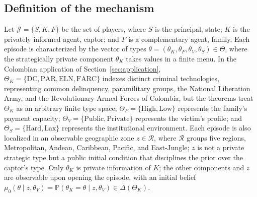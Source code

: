 \documentclass[pdflatex,sn-mathphys-ay]{sn-jnl}
\theoremstyle{plain}
\theoremstyle{definition}
\newcommand{\Prob}{\mathbb{P}}
\newcommand{\ThetaK}{\Theta_K}
\newcommand{\1}{\mathbf{1}}
\begin{document}
\subsection{Definition of the mechanism}\label{subsec:def-mecanismo}


Let $\mathcal{J}=\{S,K,F\}$ be the set of players, where $S$ is the principal, state; $K$ is the privately informed agent, captor; and $F$ is a complementary agent, family. Each episode is characterized by the vector of types $\theta=(\theta_K,\theta_F,\theta_V,\theta_S)\in\Theta$, where the strategically private component $\theta_K$ takes values in a finite menu. In the Colombian application of Section~\ref{sec:application}, $\ThetaK=\{\text{DC},\text{PAR},\text{ELN},\text{FARC}\}$ indexes distinct criminal technologies, representing common delinquency, paramilitary groups, the National Liberation Army, and the Revolutionary Armed Forces of Colombia, but the theorems treat $\ThetaK$ as an arbitrary finite type space; $\Theta_F=\{\text{High},\text{Low}\}$ represents the family's payment capacity; $\Theta_V=\{\text{Public},\text{Private}\}$ represents the victim's profile; and $\Theta_S=\{\text{Hard},\text{Lax}\}$ represents the institutional environment. Each episode is also localized in an observable geographic zone $z\in\mathcal{R}$, where $\mathcal{R}$ groups five regions, Metropolitan, Andean, Caribbean, Pacific, and East-Jungle; $z$ is not a private strategic type but a public initial condition that disciplines the prior over the captor's type. Only $\theta_K$ is private information of $K$; the other components and $z$ are observable upon opening the episode, with an initial belief $\mu_0(\theta\mid z,\theta_V)=\Prob(\theta_K=\theta\mid z,\theta_V)\in\Delta(\ThetaK)$.
\end{document}
